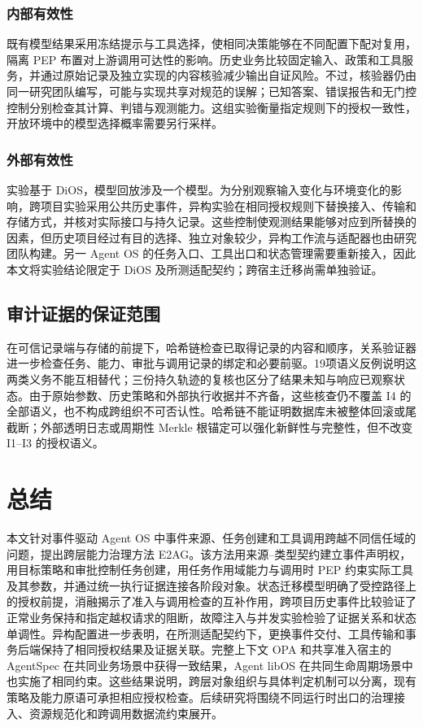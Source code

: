\subsubsection{内部有效性}

既有模型结果采用冻结提示与工具选择，使相同决策能够在不同配置下配对复用，隔离 PEP 布置对上游调用可达性的影响。历史业务比较固定输入、政策和工具服务，并通过原始记录及独立实现的内容核验减少输出自证风险。不过，核验器仍由同一研究团队编写，可能与实现共享对规范的误解；已知答案、错误报告和无门控控制分别检查其计算、判错与观测能力。这组实验衡量指定规则下的授权一致性，开放环境中的模型选择概率需要另行采样。

\subsubsection{外部有效性}

实验基于 DiOS，模型回放涉及一个模型。为分别观察输入变化与环境变化的影响，跨项目实验采用公共历史事件，异构实验在相同授权规则下替换接入、传输和存储方式，并核对实际接口与持久记录。这些控制使观测结果能够对应到所替换的因素，但历史项目经过有目的选择、独立对象较少，异构工作流与适配器也由研究团队构建。另一 Agent OS 的任务入口、工具出口和状态管理需要重新接入，因此本文将实验结论限定于 DiOS 及所测适配契约；跨宿主迁移尚需单独验证。

\subsection{审计证据的保证范围}

在可信记录端与存储的前提下，哈希链检查已取得记录的内容和顺序，关系验证器进一步检查任务、能力、审批与调用记录的绑定和必要前驱。19项语义反例说明这两类义务不能互相替代；三份持久轨迹的复核也区分了结果未知与响应已观察状态。由于原始参数、历史策略和外部执行收据并不齐备，这些核查仍不覆盖 I4 的全部语义，也不构成跨组织不可否认性。哈希链不能证明数据库未被整体回滚或尾截断；外部透明日志或周期性 Merkle 根锚定可以强化新鲜性与完整性，但不改变 I1--I3 的授权语义。

\section{总结}\label{sec:conclusion-v11}

本文针对事件驱动 Agent OS 中事件来源、任务创建和工具调用跨越不同信任域的问题，提出跨层能力治理方法 E2AG。该方法用来源--类型契约建立事件声明权，用目标策略和审批控制任务创建，用任务作用域能力与调用时 PEP 约束实际工具及其参数，并通过统一执行证据连接各阶段对象。状态迁移模型明确了受控路径上的授权前提，消融揭示了准入与调用检查的互补作用，跨项目历史事件比较验证了正常业务保持和指定越权请求的阻断，故障注入与并发实验检验了证据关系和状态单调性。异构配置进一步表明，在所测适配契约下，更换事件交付、工具传输和事务后端保持了相同授权结果及证据关联。完整上下文 OPA 和共享准入宿主的 AgentSpec 在共同业务场景中获得一致结果，Agent libOS 在共同生命周期场景中也实施了相同约束。这些结果说明，跨层对象组织与具体判定机制可以分离，现有策略及能力原语可承担相应授权检查。后续研究将围绕不同运行时出口的治理接入、资源规范化和跨调用数据流约束展开。

